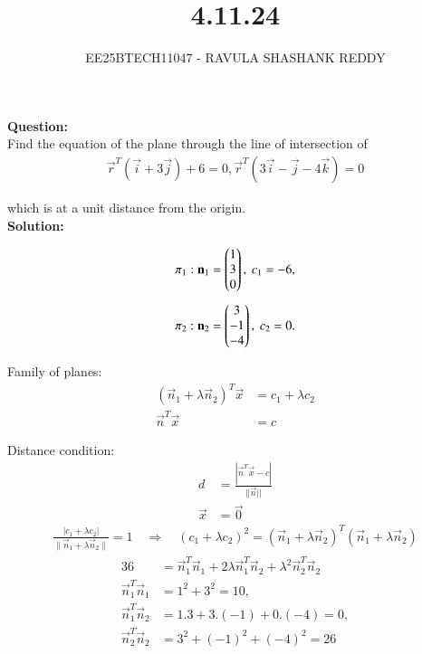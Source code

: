 \documentclass[journal]{article}
\begin{document}
	
	
	\vspace{3cm}
	
\title{4.11.24}
\author{EE25BTECH11047 - RAVULA SHASHANK REDDY}
\maketitle
\hrulefill
\bigskip 

\renewcommand{\thetable}{\theenumi}
\setlength{\intextsep}{10pt}

\textbf{Question:}\\  

Find the equation of the plane through the line of intersection of
\begin{align*}
\vec{r}^T (\vec{i} + 3\vec{j}) + 6 = 0,
\vec{r}^T (3\vec{i} - \vec{j} - 4\vec{k}) = 0
\end{align*}

which is at a unit distance from the origin.\\

\textbf{Solution:}

\begin{align}
\pi_1 &: 
 \mathbf{n}_1=\begin{pmatrix}1\\3\\0\end{pmatrix}, \ c_1=-6, \\[1ex]
\pi_2 &: \mathbf{n}_2=\begin{pmatrix}3\\-1\\-4\end{pmatrix}, \ c_2=0.
\end{align}

Family of planes:
\begin{align}
(\vec{n}_1+\lambda\vec{n}_2)^T\vec{x}&=c_1+\lambda c_2\\
\vec{n}^T\vec{x}  &= c
\end{align}

Distance condition:
\begin{align}
d&=\frac{|\vec{n}^T\vec{x}-c|}{||\vec{n}||}\\
\vec{x}&=\vec{0}
\end{align}
\begin{align}
\frac{|c_1+\lambda c_2|}{\|\vec{n}_1+\lambda\vec{n}_2\|}=1
\quad\Longrightarrow\quad
(c_1+\lambda c_2)^2=(\vec{n}_1+\lambda\vec{n}_2)^T(\vec{n}_1+\lambda\vec{n}_2)
\end{align}
\begin{align}
36&=\vec{n}_1^T\vec{n}_1+2\lambda\vec{n}_1^T\vec{n}_2+\lambda^2\vec{n}_2^T\vec{n}_2\\
\vec{n}_1^T\vec{n}_1&=1^2+3^2=10,\\
\vec{n}_1^T\vec{n}_2&=1.3+3.(-1)+0.(-4)=0,\\
\vec{n}_2^T\vec{n}_2&=3^2+(-1)^2+(-4)^2=26
\end{align}
\end{document}
